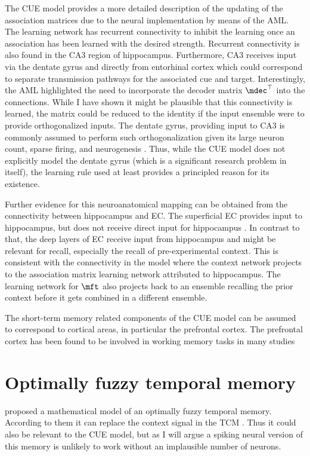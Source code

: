 The CUE model provides a more detailed description of the updating of the association matrices due to the neural implementation by means of the AML\@.
The learning network has recurrent connectivity to inhibit the learning once an association has been learned with the desired strength.
Recurrent connectivity is also found in the CA3 region of hippocampus.
Furthermore, CA3 receives input via the dentate gyrus and directly from entorhinal cortex which could correspond to separate transmission pathways for the associated cue and target.
Interestingly, the AML highlighted the need to incorporate the decoder matrix $\mdec\Tr$ into the connections.
While I have shown it might be plausible that this connectivity is learned, the matrix could be reduced to the identity if the input ensemble were to provide orthogonalized inputs.
The dentate gyrus, providing input to CA3 is commonly assumed to perform such orthogonalization given its large neuron count, sparse firing, and neurogenesis \parencite[e.g.,][]{boss1987,jung1993-1,piatti2013}.
Thus, while the CUE model does not explicitly model the dentate gyrus (which is a significant research problem in itself), the learning rule used at least provides a principled reason for its existence.

Further evidence for this neuroanatomical mapping can be obtained from the connectivity between hippocampus and EC\@.
The superficial EC provides input to hippocampus, but does not receive direct input for hippocampus \parencite{witter2010}.
In contrast to that, the deep layers of EC receive input from hippocampus and might be relevant for recall, especially the recall of pre-experimental context.
This is consistent with the connectivity in the model where the context network projects to the association matrix learning network attributed to hippocampus.
The learning network for $\mft$ also projects back to an ensemble recalling the prior context before it gets combined in a different ensemble.

The short-term memory related components of the CUE model can be assumed to correspond to cortical areas, in particular the prefrontal cortex.
The prefrontal cortex has been found to be involved in working memory tasks in many studies \parencite[e.g.,][]{goldman-rakic1995,owen1997}


\section{Optimally fuzzy temporal memory}
\Textcite{shankar2013} proposed a mathematical model of an optimally fuzzy temporal memory.
According to them it can replace the context signal in the TCM \parencite{howard2015}.
Thus it could also be relevant to the CUE model, but as I will argue a spiking neural version of this memory is unlikely to work without an implausible number of neurons.

